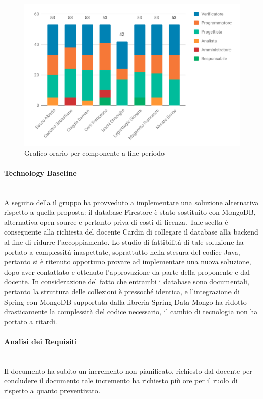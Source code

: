 \begin{figure}[H]
\centering
\includegraphics[scale=.8]{Consuntivo/grafici/ConsCod.pdf} 
\caption{Grafico orario per componente a fine periodo}
\end{figure}
\paragraph{Technology Baseline} \mbox{}\\
A seguito della \RP{} il gruppo ha provveduto a implementare una soluzione alternativa rispetto a quella proposta: il database Firestore è stato sostituito con MongoDB, alternativa open-source e pertanto priva di costi di licenza. Tale scelta è conseguente alla richiesta del docente Cardin di collegare il {database} alla backend al fine di ridurre l'accoppiamento. Lo studio di fattibilità di tale soluzione ha portato a complessità inaspettate, soprattutto nella stesura del codice Java, pertanto si è ritenuto opportuno provare ad implementare una nuova soluzione, dopo aver contattato e ottenuto l'approvazione da parte della proponente e dal docente. In considerazione del fatto che entrambi i database sono documentali, pertanto la struttura delle collezioni è pressoché identica, e l'integrazione di Spring con MongoDB supportata dalla libreria Spring Data Mongo ha ridotto drasticamente la complessità del codice necessario, il cambio di tecnologia non ha portato a ritardi.

\paragraph{Analisi dei Requisiti} \mbox{}\\
Il documento ha subito un incremento non pianificato, richiesto dal docente per concludere il documento tale incremento ha richiesto più ore per il ruolo di \ana{} rispetto a quanto preventivato.

